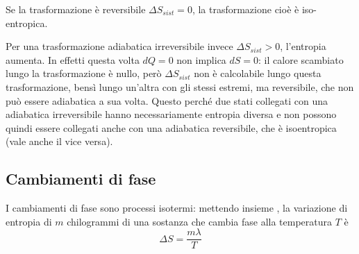 \documentclass[class=book, crop=false, oneside, 12pt]{standalone}
\begin{document}
Se la trasformazione è reversibile \(\Delta S_{sist} = 0\), la trasformazione cioè è iso-entropica.

Per una trasformazione adiabatica irreversibile invece \(\Delta S_{sist}> 0 \), l'entropia aumenta. 
In effetti questa volta \(d Q =0\) non implica \(d S =0\): il calore scambiato lungo la trasformazione è nullo, però \(\Delta S_{sist}\) non è calcolabile lungo questa trasformazione, bensì lungo un'altra con gli stessi estremi, ma reversibile, che non può essere adiabatica a sua volta. 
Questo perché due stati collegati con una adiabatica irreversibile hanno necessariamente entropia diversa e non possono quindi essere collegati anche con una adiabatica reversibile, che è isoentropica (vale anche il vice versa).

\subsection{Cambiamenti di fase}
I cambiamenti di fase sono processi isotermi: mettendo insieme , la variazione di entropia di \(m\) chilogrammi di una sostanza che cambia fase alla temperatura \(T\) è 
\begin{equation}
    \Delta S = \frac{m \lambda}{T}
\end{equation}
\end{document}
